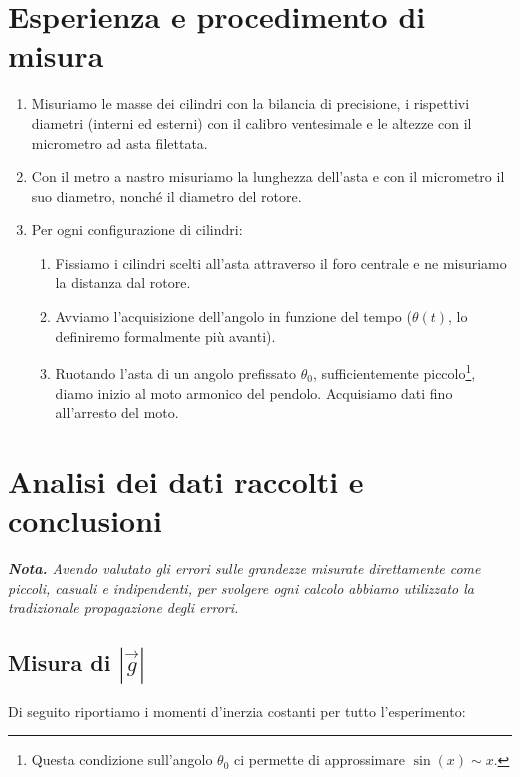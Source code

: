 \documentclass{article}
\begin{document}
\section{Esperienza e procedimento di misura}

\begin{enumerate}
    \item
        Misuriamo le masse dei cilindri con la bilancia di precisione,
        i rispettivi diametri (interni ed esterni) con il calibro ventesimale
        e le altezze con il micrometro ad asta filettata.
    \item
        Con il metro a nastro misuriamo la lunghezza dell'asta e con il
        micrometro il suo diametro, nonché il diametro del rotore.
    \item
        Per ogni configurazione di cilindri:  %
    \begin{enumerate}
        \item
            Fissiamo i cilindri scelti all'asta attraverso il foro centrale
            e ne misuriamo la distanza dal rotore.
        \item
            Avviamo l'acquisizione dell'angolo in funzione del tempo
            ($\theta(t)$, lo definiremo formalmente più avanti).
        \item
            Ruotando l'asta di un angolo prefissato $\theta_0$,
            sufficientemente piccolo\footnote{
                Questa condizione sull'angolo $\theta_0$ ci permette di
                approssimare $\sin(x) \sim x$. %
            },
            diamo inizio al moto armonico del pendolo.
            Acquisiamo dati fino all'arresto del moto.
    \end{enumerate}
\end{enumerate}

\section{Analisi dei dati raccolti e conclusioni}
\emph{\textbf{Nota.}
Avendo valutato gli errori sulle grandezze misurate direttamente
come piccoli, casuali e indipendenti, per svolgere ogni calcolo
abbiamo utilizzato la tradizionale propagazione degli errori.
}

\subsection{Misura di $\left|\vec{g}\right|$}

Di seguito riportiamo i momenti d'inerzia costanti per tutto l'esperimento:
\end{document}
